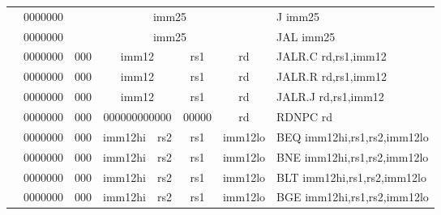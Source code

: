 \begin{table}[p]
\begin{small}
\begin{center}
\begin{tabular}{rcccccccccl}
&
\multicolumn{1}{|c|}{0000000} &
\multicolumn{8}{c|}{imm25} & J imm25 \\
\cline{2-10}
  

&
\multicolumn{1}{|c|}{0000000} &
\multicolumn{8}{c|}{imm25} & JAL imm25 \\
\cline{2-10}
  

&
\multicolumn{1}{|c|}{0000000} &
\multicolumn{2}{c|}{000} &
\multicolumn{4}{c|}{imm12} &
\multicolumn{1}{c|}{rs1} &
\multicolumn{1}{c|}{rd} & JALR.C rd,rs1,imm12 \\
\cline{2-10}
  

&
\multicolumn{1}{|c|}{0000000} &
\multicolumn{2}{c|}{000} &
\multicolumn{4}{c|}{imm12} &
\multicolumn{1}{c|}{rs1} &
\multicolumn{1}{c|}{rd} & JALR.R rd,rs1,imm12 \\
\cline{2-10}
  

&
\multicolumn{1}{|c|}{0000000} &
\multicolumn{2}{c|}{000} &
\multicolumn{4}{c|}{imm12} &
\multicolumn{1}{c|}{rs1} &
\multicolumn{1}{c|}{rd} & JALR.J rd,rs1,imm12 \\
\cline{2-10}
  

&
\multicolumn{1}{|c|}{0000000} &
\multicolumn{2}{c|}{000} &
\multicolumn{4}{c|}{000000000000} &
\multicolumn{1}{c|}{00000} &
\multicolumn{1}{c|}{rd} & RDNPC rd \\
\cline{2-10}
  

&
\multicolumn{1}{|c|}{0000000} &
\multicolumn{2}{c|}{000} &
\multicolumn{3}{c|}{imm12hi} &
\multicolumn{1}{c|}{rs2} &
\multicolumn{1}{c|}{rs1} &
\multicolumn{1}{c|}{imm12lo} & BEQ imm12hi,rs1,rs2,imm12lo \\
\cline{2-10}
  

&
\multicolumn{1}{|c|}{0000000} &
\multicolumn{2}{c|}{000} &
\multicolumn{3}{c|}{imm12hi} &
\multicolumn{1}{c|}{rs2} &
\multicolumn{1}{c|}{rs1} &
\multicolumn{1}{c|}{imm12lo} & BNE imm12hi,rs1,rs2,imm12lo \\
\cline{2-10}
  

&
\multicolumn{1}{|c|}{0000000} &
\multicolumn{2}{c|}{000} &
\multicolumn{3}{c|}{imm12hi} &
\multicolumn{1}{c|}{rs2} &
\multicolumn{1}{c|}{rs1} &
\multicolumn{1}{c|}{imm12lo} & BLT imm12hi,rs1,rs2,imm12lo \\
\cline{2-10}
  

&
\multicolumn{1}{|c|}{0000000} &
\multicolumn{2}{c|}{000} &
\multicolumn{3}{c|}{imm12hi} &
\multicolumn{1}{c|}{rs2} &
\multicolumn{1}{c|}{rs1} &
\multicolumn{1}{c|}{imm12lo} & BGE imm12hi,rs1,rs2,imm12lo \\
\cline{2-10}
  


\end{tabular}
\end{center}
\end{small}
\end{table}
